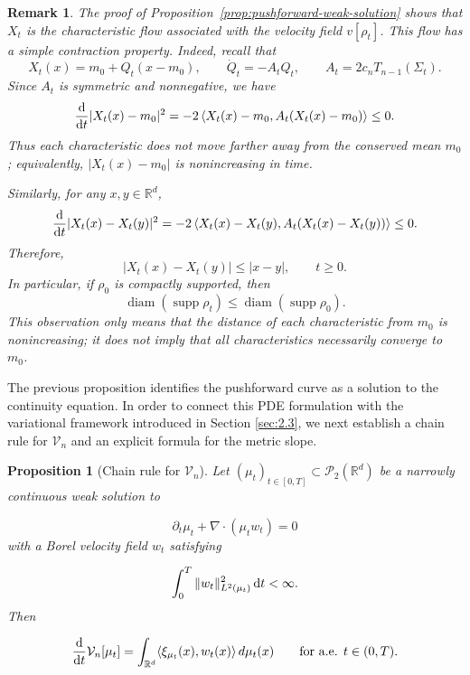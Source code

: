 \documentclass[11pt,reqno]{amsart}
\numberwithin{figure}{section}
\def\d {{\partial}}
\def\d{\mathrm{d}}
\renewcommand{\d}{  {\textup{d}} }
\newtheorem{proposition}{Proposition}[section]
\newtheorem{remark}{Remark}[section]
\begin{document}
\begin{remark}
The proof of Proposition~\ref{prop:pushforward-weak-solution} shows that
$X_t$ is the characteristic flow associated with the velocity field
$v[\rho_t]$. This flow has a simple contraction property. Indeed, recall that
\[
X_t(x)=m_0+Q_t(x-m_0),
\qquad
\dot Q_t=-A_tQ_t,
\qquad
A_t=2c_nT_{n-1}(\Sigma_t).
\]
Since $A_t$ is symmetric and nonnegative, we have
\[
\frac{\d}{\d t}|X_t(x)-m_0|^2
=
-2\left\langle X_t(x)-m_0,
A_t(X_t(x)-m_0)\right\rangle
\le 0.
\]
Thus each characteristic does not move farther away from the conserved mean
$m_0$; equivalently, $|X_t(x)-m_0|$ is nonincreasing in time.

Similarly, for any $x,y\in\mathbb R^d$,
\[
\frac{\d}{\d t}|X_t(x)-X_t(y)|^2
=
-2\left\langle X_t(x)-X_t(y),
A_t(X_t(x)-X_t(y))\right\rangle
\le 0.
\]
Therefore,
\[
|X_t(x)-X_t(y)|\le |x-y|,
\qquad t\ge0.
\]
In particular, if $\rho_0$ is compactly supported, then
\[
\operatorname{diam}(\operatorname{supp}\rho_t)
\le
\operatorname{diam}(\operatorname{supp}\rho_0).
\]
This observation only means that the distance of each characteristic from
$m_0$ is nonincreasing; it does not imply that all characteristics necessarily
converge to $m_0$.
\end{remark}


The previous proposition identifies the pushforward curve as a solution to the continuity equation. In order to connect this PDE formulation with the variational framework introduced in Section \ref{sec:2.3}, we next establish a chain rule for $\mathcal V_n$ and an explicit formula for the metric slope. 

\begin{proposition}[Chain rule for $\mathcal V_n$] \label{prop:chain-rule-Vn} Let $(\mu_t)_{t\in[0,T]}\subset\mathcal P_2(\mathbb R^d)$ be a narrowly continuous weak solution to 

\[ \partial_t\mu_t+\nabla\cdot(\mu_t w_t)=0 \] 
with a Borel velocity field $w_t$ satisfying 

\[ \int_0^T \|w_t\|_{L^2(\mu_t)}^2\,\d t<\infty. \] 
Then

\[ \frac{\d}{\d t}\mathcal V_n[\mu_t] = \int_{\mathbb R^d}\langle \xi_{\mu_t}(x),w_t(x)\rangle\,d\mu_t(x) \qquad\text{for a.e. }t\in(0,T). \] 
\end{proposition} 
\end{document}
